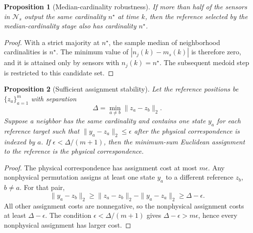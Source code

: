 \documentclass{IEEEtaes}
\newtheorem{proposition}{Proposition}
\begin{document}
\begin{proposition}[Median-cardinality robustness]
If more than half of the sensors in $\mathcal{N}_s$ output the same cardinality $n^\star$ at time $k$, then the reference selected by the median-cardinality stage also has cardinality $n^\star$.
\end{proposition}
\begin{proof}
With a strict majority at $n^\star$, the sample median of neighborhood cardinalities is $n^\star$. The minimum value of $|n_j(k)-m_s(k)|$ is therefore zero, and it is attained only by sensors with $n_j(k)=n^\star$. The subsequent medoid step is restricted to this candidate set.
\end{proof}

\begin{proposition}[Sufficient assignment stability]
Let the reference positions be $\{z_a\}_{a=1}^{m}$ with separation
\begin{equation}
  \Delta=\min_{a\ne b}\|z_a-z_b\|_2 .
\end{equation}
Suppose a neighbor has the same cardinality and contains one state $y_a$ for each reference target such that $\|y_a-z_a\|_2\le\epsilon$ after the physical correspondence is indexed by $a$. If $\epsilon<\Delta/(m+1)$, then the minimum-sum Euclidean assignment to the reference is the physical correspondence.
\end{proposition}
\begin{proof}
The physical correspondence has assignment cost at most $m\epsilon$. Any nonphysical permutation assigns at least one state $y_a$ to a different reference $z_b$, $b\ne a$. For that pair,
\begin{equation}
  \|y_a-z_b\|_2\ge\|z_a-z_b\|_2-\|y_a-z_a\|_2
  \ge\Delta-\epsilon .
\end{equation}
All other assignment costs are nonnegative, so the nonphysical assignment costs at least $\Delta-\epsilon$. The condition $\epsilon<\Delta/(m+1)$ gives $\Delta-\epsilon>m\epsilon$, hence every nonphysical assignment has larger cost.
\end{proof}
\end{document}
